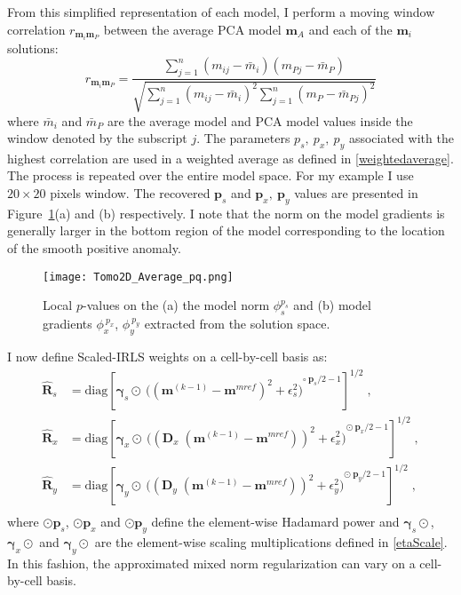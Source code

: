 From this simplified representation of each model, I perform a moving window correlation $r_{\mathbf{m}_i\mathbf{m}_P}$ between the average PCA model $\mathbf{m}_A$ and each of the $\mathbf{m}_i$ solutions:
\begin{equation}
r_{\mathbf{m}_i\mathbf{m}_P} = \frac{\sum_{j=1}^n (m_{ij} - \bar m_{i})({m_{Pj}-\bar m_{P}})}{\sqrt{\sum_{j=1}^n(m_{ij} - \bar m_{i})^2\sum_{j=1}^n(m_{P} - \bar m_{Pj})^2}}
\end{equation}
where $\bar m_{i}$ and $\bar m_{P}$ are the average model and PCA model values inside the window denoted by the subscript $j$.
The parameters $p_s,\: p_x,\: p_y$ associated with the highest correlation are used in a weighted average as defined in \eqref{weightedaverage}. The process is repeated over the entire model space. For my example I use $20 \times 20$ pixels window. The recovered $\mathbf{p}_s$ and $\mathbf{p}_x,\:\mathbf{p}_y$ values are presented in Figure~\ref{MixedNorms}(a) and (b) respectively. I note that the norm on the model gradients is generally larger in the bottom region of the model corresponding to the location of the smooth positive anomaly.
\begin{figure}
\texttt{[image: Tomo2D\_Average\_pq.png]}
\caption{Local $p$-values on the (a) the model norm $\phi_s^{p_s}$ and (b) model gradients $\phi_{x}^{\:p_x}$, $\phi_{y}^{\:p_y}$ extracted from the solution space.}
\label{MixedNorms}
\end{figure}

I now define Scaled-IRLS weights on a cell-by-cell basis as:
\begin{equation}\label{mixedIRLS}
\begin{split}
\mathbf{\hat R}_s &= \text{diag} \left[\boldsymbol{\gamma}_s \odot \:{\Big( ({{\mathbf{m}^{(k-1)} - \mathbf{m}^{mref}}})^{2} + \epsilon_s^2 \Big)}^{\circ\:\mathbf{p}_s/2 - 1} \right]^{1/2} \;, \\
\mathbf{\hat R}_x &= \text{diag} \left[\boldsymbol{\gamma}_x \odot\:{\Big( ({{\mathbf{D}_x\;(\mathbf{m}^{(k-1)} - \mathbf{m}^{mref})}})^{2} + \epsilon_x^2 \Big)}^{\odot\:\mathbf{p}_x/2 - 1} \right]^{1/2} \;,\\
\mathbf{\hat R}_y &= \text{diag} \left[\boldsymbol{\gamma}_y \odot\:{\Big( ({{\mathbf{D}_y\;(\mathbf{m}^{(k-1)} - \mathbf{m}^{mref})}})^{2} + \epsilon_y^2 \Big)}^{\odot\:\mathbf{p}_y/2 - 1} \right]^{1/2} \;,\\
\end{split}
\end{equation}
where $\odot\mathbf{p}_s$, $\odot\mathbf{p}_{x}$ and $\odot\mathbf{p}_y$ define the element-wise Hadamard power and $\boldsymbol{\gamma}_s \odot$, $\boldsymbol{\gamma}_x \odot$ and $\boldsymbol{\gamma}_y\odot$ are the element-wise scaling multiplications defined in \eqref{etaScale}. In this fashion, the approximated mixed norm regularization can vary on a cell-by-cell basis.

